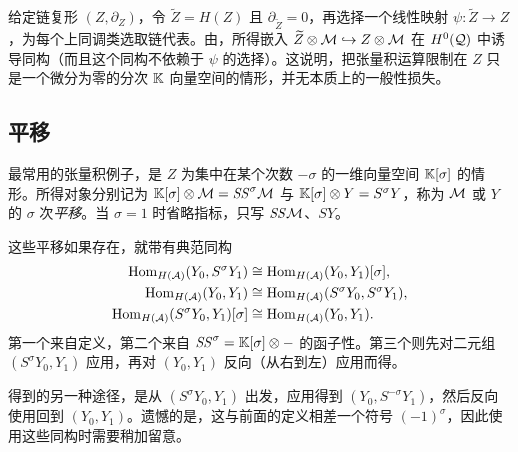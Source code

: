 \begin{note}\label{st:3.2}
给定链复形 $(Z,\partial_Z)$，令 $\widetilde Z=H(Z)$ 且 $\partial_{\widetilde Z}=0$，再选择一个线性映射 $\psi:\widetilde Z\to Z$，为每个上同调类选取链代表。由，所得嵌入 $\widetilde Z\otimes\mathcal M\hookrightarrow Z\otimes\mathcal M$ 在 $H^0(\mathcal Q)$ 中诱导同构（而且这个同构不依赖于 $\psi$ 的选择）。这说明，把张量积运算限制在 $Z$ 只是一个微分为零的分次 $\mathbb K$ 向量空间的情形，并无本质上的一般性损失。
\end{note}

\subsection{平移}\label{sec:3d}
\begin{definition*}
最常用的张量积例子，是 $Z$ 为集中在某个次数 $-\sigma$ 的一维向量空间 $\mathbb K[\sigma]$ 的情形。所得对象分别记为 $\mathbb K[\sigma]\otimes\mathcal M=\mathit{SS}^{\sigma}\mathcal M$ 与 $\mathbb K[\sigma]\otimes Y=S^{\sigma} Y$，称为 $\mathcal M$ 或 $Y$ 的
$\sigma$ 次\emph{平移}。当 $\sigma=1$ 时省略指标，只写 $\mathit{SS}\mathcal M$、$SY$。
\end{definition*}
这些平移如果存在，就带有典范同构
\begin{align}
\operatorname{Hom}_{H(\mathcal A)}(Y_0,S^{\sigma} Y_1)&\cong\operatorname{Hom}_{H(\mathcal A)}(Y_0,Y_1)[\sigma],\label{eq:3.3}\\
\operatorname{Hom}_{H(\mathcal A)}(Y_0,Y_1)&\cong\operatorname{Hom}_{H(\mathcal A)}(S^{\sigma} Y_0,S^{\sigma} Y_1),\label{eq:3.4}\\
\operatorname{Hom}_{H(\mathcal A)}(S^{\sigma} Y_0,Y_1)[\sigma]&\cong\operatorname{Hom}_{H(\mathcal A)}(Y_0,Y_1).\label{eq:3.5}
\end{align}
第一个来自定义，第二个来自 $\mathit{SS}^{\sigma}=\mathbb K[\sigma]\otimes-$ 的函子性。第三个则先对二元组 $(S^{\sigma} Y_0,Y_1)$ 应用，再对 $(Y_0,Y_1)$ 反向（从右到左）应用而得。

\clearpage
\begin{note}\label{st:3.3}
得到的另一种途径，是从 $(S^{\sigma} Y_0,Y_1)$ 出发，应用得到 $(Y_0,S^{-\sigma}Y_1)$，然后反向使用回到 $(Y_0,Y_1)$。遗憾的是，这与前面的定义相差一个符号 $(-1)^{\sigma}$，因此使用这些同构时需要稍加留意。
\end{note}

